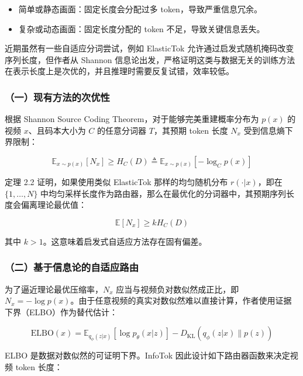 \begin{itemize}
\tightlist
\item
  简单或静态画面：固定长度会分配过多 token，导致严重信息冗余。
\item
  复杂或动态画面：固定长度分配的 token 不足，导致关键信息丢失。
\end{itemize}

近期虽然有一些自适应分词尝试，例如 ElasticTok 允许通过启发式随机掩码改变序列长度，但作者从 Shannon 信息论出发，严格证明这类与数据无关的训练方法在表示长度上是次优的，并且推理时需要反复试错，效率较低。

\hypertarget{ux4e00ux73b0ux6709ux65b9ux6cd5ux7684ux6b21ux4f18ux6027}{%
\subsubsection{（一）现有方法的次优性}\label{ux4e00ux73b0ux6709ux65b9ux6cd5ux7684ux6b21ux4f18ux6027}}

根据 Shannon Source Coding Theorem，对于能够完美重建概率分布为 \(p(x)\) 的视频 \(x\)、且码本大小为 \(C\) 的任意分词器 \(T\)，其预期 token 长度 \(N_x\) 受到信息熵下界限制：

\[
\mathbb{E}_{x\sim p(x)}[N_x]\ge H_C(D)
\triangleq
\mathbb{E}_{x\sim p(x)}[-\log_C p(x)]
\]

定理 2.2 证明，如果使用类似 ElasticTok 那样的均匀随机分布 \(r(\cdot|x)\)，即在 \(\{1,\ldots,N\}\) 中均匀采样长度作为路由器，那么在最优化的分词器中，其预期序列长度会偏离理论最优值：

\[
\mathbb{E}[N_x]\ge kH_C(D)
\]

其中 \(k\gt 1\)。这意味着启发式自适应方法存在固有偏差。

\hypertarget{ux4e8cux57faux4e8eux4fe1ux606fux8bbaux7684ux81eaux9002ux5e94ux8defux7531}{%
\subsubsection{（二）基于信息论的自适应路由}\label{ux4e8cux57faux4e8eux4fe1ux606fux8bbaux7684ux81eaux9002ux5e94ux8defux7531}}

为了逼近理论最优压缩率，\(N_x\) 应当与视频负对数似然成正比，即 \(N_x=-\log p(x)\)。由于任意视频的真实对数似然难以直接计算，作者使用证据下界（ELBO）作为替代估计：

\[
\mathrm{ELBO}(x) =
\mathbb{E}_{q_\phi(z|x)}[\log p_\theta(x|z)] -
D_{\mathrm{KL}}(q_\phi(z|x)\|p(z))
\]

ELBO 是数据对数似然的可证明下界。InfoTok 因此设计如下路由器函数来决定视频 token 长度：

